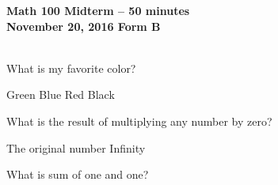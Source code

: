 \documentclass[10pt]{exam}
\begin{document}
\setlength\fillinlinelength{0.5in}
\header{}
{\bf{Math 100
 Midterm
 -- 50 minutes
\\November 20, 2016
}}
{\bf{Form B}\\~}
\vspace{.5cm}
\begin{questions}

\begin{minipage}[c]{\linewidth}
\question What is my favorite color?
\begin{choices}
\choice Green
\vspace{-0.1in}
\choice Blue
\vspace{-0.1in}
\choice Red\vspace{-0.1in}
\choice Black
\end{choices}
\end{minipage}

\begin{minipage}[c]{\linewidth}
\question What is the result of multiplying any number by zero?
\begin{choices}
\choice The original number
\vspace{-0.1in}
\vspace{-0.1in}
\vspace{-0.1in}
\choice Infinity
\end{choices}
\end{minipage}

\begin{minipage}[c]{\linewidth}
\question What is sum of one and one?
\begin{choices}
\vspace{-0.1in}
\vspace{-0.1in}
\vspace{-0.1in}
\end{choices}
\end{minipage}

\end{questions}
\end{document}
